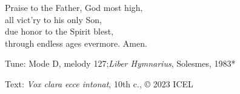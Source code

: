 \hymn



\begin{underhymnverse}
Praise to the Father, God most high,\\
all vict’ry to his only Son,\\
due honor to the Spirit blest,\\
through endless ages evermore. Amen.
\end{underhymnverse}


\begin{hymnsource}
Tune: Mode D, melody 127;\emph{Liber Hymnarius}, Solesmes, 1983*

Text: \emph{Vox clara ecce intonat}, 10th c., © 2023 ICEL
\end{hymnsource}
